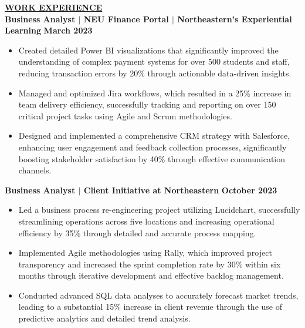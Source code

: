 \documentclass{article}
\begin{document}
\noindent \textbf{\underline{WORK EXPERIENCE}} \\
\noindent \textbf{Business Analyst $\mid$ NEU Finance Portal $\mid$ Northeastern's Experiential Learning} \hfill \textbf{March 2023}
\begin{itemize}[noitemsep,nolistsep,leftmargin=*]
\item {\small Created detailed Power BI visualizations that significantly improved the understanding of complex payment systems for over 500 students and staff, reducing transaction errors by 20\% through actionable data-driven insights.}
\item {\small Managed and optimized Jira workflows, which resulted in a 25\% increase in team delivery efficiency, successfully tracking and reporting on over 150 critical project tasks using Agile and Scrum methodologies.}
\item {\small Designed and implemented a comprehensive CRM strategy with Salesforce, enhancing user engagement and feedback collection processes, significantly boosting stakeholder satisfaction by 40\% through effective communication channels.}
\end{itemize}
\vspace{1mm}

\noindent \textbf{Business Analyst $\mid$ Client Initiative at Northeastern} \hfill \textbf{October 2023}
\begin{itemize}[noitemsep,nolistsep,leftmargin=*]
\item {\small Led a business process re-engineering project utilizing Lucidchart, successfully streamlining operations across five locations and increasing operational efficiency by 35\% through detailed and accurate process mapping.}
\item {\small Implemented Agile methodologies using Rally, which improved project transparency and increased the sprint completion rate by 30\% within six months through iterative development and effective backlog management.}
\item {\small Conducted advanced SQL data analyses to accurately forecast market trends, leading to a substantial 15\% increase in client revenue through the use of predictive analytics and detailed trend analysis.}
\end{itemize}
\vspace{1mm}
\end{document}
